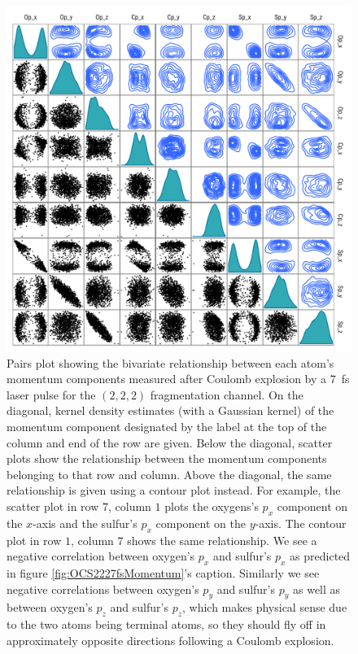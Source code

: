 \begin{figure}
  \centering
  \includegraphics[width=\textwidth]{Plots/OCS2227fsMomentumPairsPlot}
  \caption[Pairs plot showing the bivariate relationship between each atom's momentum components measured after Coulomb explosion by a \SI{7}{\fs} laser pulse for the $(2,2,2)$ fragmentation channel.]
  {Pairs plot showing the bivariate relationship between each atom's momentum components measured after Coulomb explosion by a \SI{7}{\fs} laser pulse for the $(2,2,2)$ fragmentation channel. On the diagonal, kernel density estimates (with a Gaussian kernel) of the momentum component designated by the label at the top of the column and end of the row are given. Below the diagonal, scatter plots show the relationship between the momentum components belonging to that row and column. Above the diagonal, the same relationship is given using a contour plot instead. For example, the scatter plot in row $7$, column $1$ plots the oxygens's $p_x$ component on the $x$-axis and the sulfur's $p_x$ component on the $y$-axis. The contour plot in row $1$, column $7$ shows the same relationship. We see a negative correlation between oxygen's $p_x$ and sulfur's $p_x$ as predicted in figure \ref{fig:OCS2227fsMomentum}'s caption. Similarly we see negative correlations between oxygen's $p_y$ and sulfur's $p_y$ as well as between oxygen's $p_z$ and sulfur's $p_z$, which makes physical sense due to the two atoms being terminal atoms, so they should fly off in approximately opposite directions following a Coulomb explosion.}
  \label{fig:OCS2227fsMomentumPairPlots}
\end{figure}

